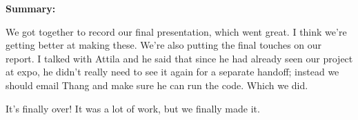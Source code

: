 \noindent \textbf{Summary:}

We got together to record our final presentation, which went great. I think we're getting better at making these. We're also putting the final touches on our report. I talked with Attila and he said that since he had already seen our project at expo, he didn't really need to see it again for a separate handoff; instead we should email Thang and make sure he can run the code. Which we did.

It's finally over! It was a lot of work, but we finally made it.
